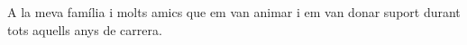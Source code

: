 A la meva família i molts amics que em van animar i em van donar suport durant tots aquells anys de carrera.
